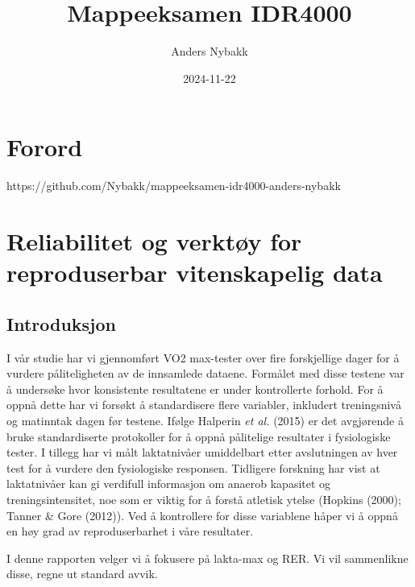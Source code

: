 \documentclass[
  letterpaper,
  DIV=11,
  numbers=noendperiod]{scrreprt}
\title{Mappeeksamen IDR4000}
\author{Anders Nybakk}
\date{2024-11-22}
\renewcommand*\contentsname{Table of contents}
\newcommand\contentsname{Table of contents}
\begin{document}
\maketitle

\renewcommand*\contentsname{Table of contents}
{
\hypersetup{linkcolor=}
\setcounter{tocdepth}{2}
\tableofcontents
}


\chapter*{Forord}\label{forord}


https://github.com/Nybakk/mappeeksamen-idr4000-anders-nybakk


\chapter{Reliabilitet og verktøy for reproduserbar vitenskapelig
data}\label{reliabilitet-og-verktuxf8y-for-reproduserbar-vitenskapelig-data}

\section{Introduksjon}\label{introduksjon}

I vår studie har vi gjennomført VO2 max-tester over fire forskjellige
dager for å vurdere påliteligheten av de innsamlede dataene. Formålet
med disse testene var å undersøke hvor konsistente resultatene er under
kontrollerte forhold. For å oppnå dette har vi forsøkt å standardisere
flere variabler, inkludert treningsnivå og matinntak dagen før testene.
Ifølge Halperin \emph{et al.} (2015) er det avgjørende å bruke
standardiserte protokoller for å oppnå pålitelige resultater i
fysiologiske tester. I tillegg har vi målt laktatnivåer umiddelbart
etter avslutningen av hver test for å vurdere den fysiologiske
responsen. Tidligere forskning har vist at laktatnivåer kan gi verdifull
informasjon om anaerob kapasitet og treningsintensitet, noe som er
viktig for å forstå atletisk ytelse (Hopkins (2000); Tanner \& Gore
(2012)). Ved å kontrollere for disse variablene håper vi å oppnå en høy
grad av reproduserbarhet i våre resultater.

I denne rapporten velger vi å fokusere på lakta-max og RER. Vi vil
sammenlikne disse, regne ut standard avvik.
\end{document}
